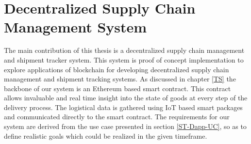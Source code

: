\section{Decentralized Supply Chain Management System} \label{usecase} 
The main contribution of this thesis is a decentralized supply chain management and shipment tracker system. This system is proof of concept implementation to explore applications of blockchain for developing decentralized supply chain management and shipment tracking systems. As discussed in chapter \ref{TS} the backbone of our system is an Ethereum based smart contract. This contract allows invaluable and real time insight into the state of goods at every step of the delivery process. The logistical data is gathered using IoT based smart packages and communicated directly to the smart contract. The requirements for our system are derived from the use case presented in section \ref{ST-Dapp-UC}, so as to define realistic goals which could be realized in the given timeframe.

\vspace{0.5cm}
